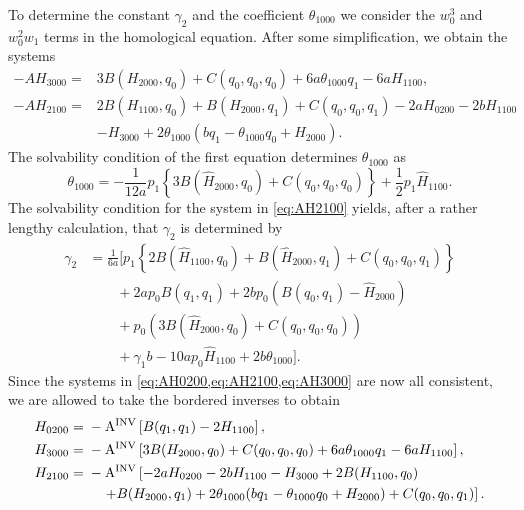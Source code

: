 To determine the constant $\gamma_2$ and the coefficient $\theta_{1000}$ we
consider the $w_0^3$ and $w_0^2w_1$ terms in the homological equation. After
some simplification, we obtain the systems
\begin{align}
\label{eq:AH3000}
-A H_{3000} ={}& 3 B(H_{2000},q_0) + C(q_0,q_0,q_0) + 6a \theta_{1000} q_1
									- 6a H_{1100}, \\
\label{eq:AH2100}
-A H_{2100} ={}& 2 B(H_{1100},q_0) + B(H_{2000},q_1) + C(q_0,q_0,q_1) - 2 a H_{0200} - 2 b H_{1100}  \\
				& -H_{3000} + 2 \theta_{1000} (bq_1 - \theta_{1000}q_0 +H_{2000}). \nonumber
\end{align}
The solvability condition of the first equation determines $\theta_{1000}$ as
\begin{equation}
\label{eq:theta1000}
\theta_{1000} = -\frac1{12a} p_1 \left\{ 
			3B(\hat H_{2000},q_0) + C(q_0,q_0,q_0)
			\right\} + \frac12 p_1 \hat H_{1100}.
\end{equation}
The solvability condition for the system in \cref{eq:AH2100} yields, after a
rather lengthy calculation, that $\gamma_2$ is determined by 
\begin{align}
\label{eq:gamma_2}
\gamma_2 &= \frac1{6a} 
\bigg[ p_1\left\{ 2 B(\hat H_{1100},q_0)+B(\hat H_{2000},q_1)
+ C(q_0,q_0,q_1) \right\} \\
  & \qquad +2a p_0 B(q_1,q_1) + 2b p_0 \left( B(q_0,q_1) 
    - \hat H_{2000} \right) \nonumber \\
	& \qquad + p_0 \left( 3B(\hat H_{2000},q_0) 
	  + C(q_0,q_0,q_0) \right) \nonumber \\
	& \qquad + \gamma_1 b - 10 a p_0 \hat H_{1100} + 2 b \theta_{1000} \bigg].
				\nonumber 
\end{align}
Since the systems in \cref{eq:AH0200,eq:AH2100,eq:AH3000} are now all consistent,
we are allowed to take the bordered inverses to obtain
\begin{align}
	H_{0200} ={} & -\operatorname{A^{\text{INV}}} \left[B(q_1,q_1) - 2H_{1100} \right], \nonumber          \\
  \label{eq:H3000}
	H_{3000} ={} & -\operatorname{A^{\text{INV}}} \left[ 3B(H_{2000},q_0) + C(q_0,q_0,q_0) +
		6a\theta_{1000}q_1 - 6a H_{1100} \right],                            \\
  \label{eq:H2100}
	H_{2100} ={} & -\operatorname{A^{\text{INV}}} \left[ -2 a H_{0200}-2 b H_{1100}-H_{3000} + 2
	B(H_{1100},q_0) \right.                                              \\
	             & \left. \quad + B(H_{2000},q_1) + 2 \theta_{1000}
	(bq_1 - \theta_{1000}q_0 +H_{2000})+C(q_0,q_0,q_1) \right]. \nonumber
\end{align}

